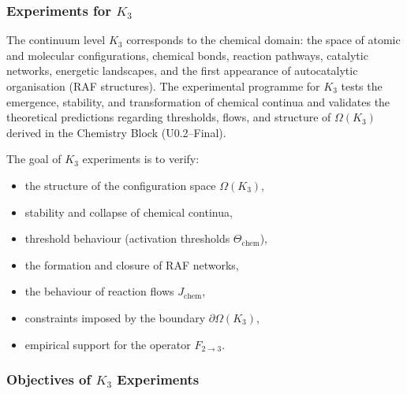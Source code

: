 
\subsubsection{Experiments for \texorpdfstring{$K_3$}{K_3}}
\label{sec:experiments-k3}

The continuum level $K_3$ corresponds to the chemical domain: 
the space of atomic and molecular configurations, chemical bonds, 
reaction pathways, catalytic networks, energetic landscapes, 
and the first appearance of autocatalytic organisation (RAF structures).  
The experimental programme for $K_3$ tests the emergence, stability, 
and transformation of chemical continua and validates the theoretical 
predictions regarding thresholds, flows, and structure of 
$\Omega(K_3)$ derived in the Chemistry Block (U0.2–Final).

The goal of $K_3$ experiments is to verify:

\begin{itemize}
    \item the structure of the configuration space $\Omega(K_3)$,
    \item stability and collapse of chemical continua,
    \item threshold behaviour (activation thresholds $\Theta_{\mathrm{chem}}$),
    \item the formation and closure of RAF networks,
    \item the behaviour of reaction flows $J_{\mathrm{chem}}$,
    \item constraints imposed by the boundary $\partial \Omega(K_3)$,
    \item empirical support for the operator $F_{2\rightarrow 3}$.
\end{itemize}



\subsubsection{Objectives of \texorpdfstring{$K_3$}{K_3} Experiments}

